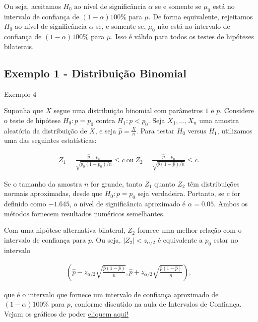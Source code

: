 \documentclass[12pt]{beamer}
\begin{document}
\begin{frame}{}
\begin{block}{}
\justifying
Ou seja, aceitamos $H_0$ ao nível de significância $\alpha$ se e somente se $\mu_0$ está no intervalo de confiança de $(1 - \alpha)100\%$ para $\mu$. De forma equivalente, rejeitamos $H_0$ ao nível de significância $\alpha$ se, e somente se, $\mu_0$ não está no intervalo de confiança de $(1 - \alpha)100\%$ para $\mu$. Isso é válido para todos os testes de hipóteses bilaterais.
\end{block}
\end{frame}

\subsection{Exemplo 1 - Distribuição Binomial}
\begin{frame}{Exemplo 4}
\begin{block}{}
\justifying
Suponha que $X$ segue uma distribuição binomial com parâmetros $1$ e $p$. Considere o teste de hipótese $H_0 : p = p_0$ contra $H_1 : p < p_0$. Seja $X_1, \ldots, X_n$ uma amostra aleatória da distribuição de $X$, e seja $\hat{p} = \frac{X}{n}$. Para testar $H_0$ versus $H_1$, utilizamos uma das seguintes estatísticas:

\begin{align*}
Z_1 = \frac{\hat{p} - p_0}{\sqrt{p_0(1 - p_0)/n}} \leq c~\text{ou}~Z_2 = \frac{\hat{p}-p_0}{\sqrt{\hat{p}(1 - \hat{p})/n}} \leq c.
\end{align*}

Se o tamanho da amostra $n$ for grande, tanto $Z_1$ quanto $Z_2$ têm distribuições normais aproximadas, desde que $H_0 : p = p_0$ seja verdadeira. Portanto, se $c$ for definido como $-1.645$, o nível de significância aproximado é $\alpha = 0.05$. Ambos os métodos fornecem resultados numéricos semelhantes.
\end{block}
\end{frame}


\begin{frame}{}
\begin{block}{}
\justifying
Com uma hipótese alternativa bilateral, $Z_2$ fornece uma melhor relação com o intervalo de confiança para $p$. Ou seja, $|Z_2| < z_{\alpha/2}$ é equivalente a $p_0$ estar no intervalo

\begin{align*}
\left(\hat{p} - z_{\alpha/2}\sqrt{\frac{\hat{p}(1 - \hat{p})}{n}}, \hat{p} + z_{\alpha/2}\sqrt{\frac{\hat{p}(1 - \hat{p})}{n}}\right),
\end{align*}

que é o intervalo que fornece um intervalo de confiança aproximado de $(1 - \alpha)100\%$ para $p$, conforme discutido na aula de Intervalos de Confiança. Vejam os gráficos de poder \href{https://est711.shinyapps.io/FuncaoPoder/}{cliquem aqui!}
\end{block}
\end{frame}
\end{document}
